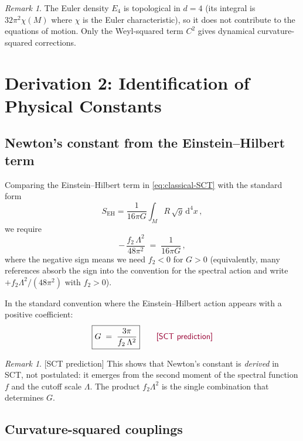 \documentclass[12pt,a4paper]{article}
\theoremstyle{definition}
\theoremstyle{remark}
\newtheorem{remark}[proposition]{Remark}
\newcommand{\dd}{\mathrm{d}}
\newcommand{\sctpred}{\textcolor{purple!80!black}{\textsf{[SCT prediction]}}}
\begin{document}
\begin{remark}
The Euler density $E_4$ is topological in $d=4$ (its integral is
$32\pi^2\chi(M)$ where $\chi$ is the Euler characteristic), so it
does not contribute to the equations of motion.  Only the Weyl-squared
term $C^2$ gives dynamical curvature-squared corrections.
\end{remark}


\newpage
\section{Derivation 2: Identification of Physical Constants}
\label{sec:constants}

\subsection{Newton's constant from the Einstein--Hilbert term}

Comparing the Einstein--Hilbert term in \eqref{eq:classical-SCT} with
the standard form
\begin{equation}
  S_{\mathrm{EH}}
  = \frac{1}{16\pi G}
    \int_M R\,\sqrt{g}\,\dd^4 x\,,
  \label{eq:EH-standard}
\end{equation}
we require
\begin{equation}
  -\,\frac{f_2\,\Lambda^2}{48\pi^2}
  \;=\;
  \frac{1}{16\pi G}\,,
\end{equation}
where the negative sign means we need $f_2<0$ for $G>0$ (equivalently,
many references absorb the sign into the convention for the
spectral action and write $+f_2\Lambda^2/(48\pi^2)$ with $f_2>0$).

In the standard convention where the Einstein--Hilbert action
appears with a positive coefficient:
\begin{equation}
  \boxed{
  G \;=\; \frac{3\pi}{f_2\,\Lambda^2}
  }
  \qquad\sctpred
  \label{eq:G-from-SCT}
\end{equation}

\begin{remark}
\sctpred\;
This shows that Newton's constant is \emph{derived} in SCT, not
postulated: it emerges from the second moment of the spectral
function $f$ and the cutoff scale $\Lambda$.  The product
$f_2\Lambda^2$ is the single combination that determines
$G$.
\end{remark}


\subsection{Curvature-squared couplings}
\end{document}
